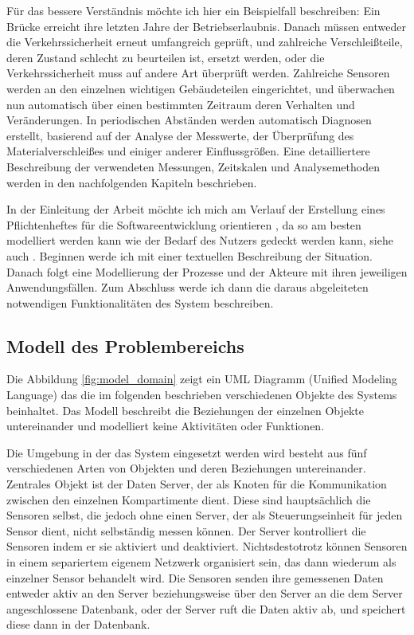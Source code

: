 Für das bessere Verständnis möchte ich hier ein Beispielfall beschreiben: Ein Brücke erreicht ihre letzten Jahre der Betriebserlaubnis. Danach müssen entweder die Verkehrssicherheit erneut umfangreich geprüft, und zahlreiche Verschleißteile, deren Zustand schlecht zu beurteilen ist, ersetzt werden, oder die Verkehrssicherheit muss auf andere Art überprüft werden. Zahlreiche Sensoren werden an den einzelnen wichtigen Gebäudeteilen eingerichtet, und überwachen nun automatisch über einen bestimmten Zeitraum deren Verhalten und Veränderungen. In periodischen Abständen werden automatisch Diagnosen erstellt, basierend auf der Analyse der Messwerte, der Überprüfung des Materialverschleißes und einiger anderer Einflussgrößen. Eine detailliertere Beschreibung der verwendeten Messungen, Zeitskalen und Analysemethoden werden in den nachfolgenden Kapiteln beschrieben.

In der Einleitung der Arbeit möchte ich mich am Verlauf der Erstellung eines Pflichtenheftes für die Softwareentwicklung orientieren , da so am besten modelliert werden kann wie der Bedarf des Nutzers gedeckt werden kann, siehe auch \citep{gregor_engels_vorlesung_2006}. Beginnen werde ich mit einer textuellen Beschreibung der Situation. Danach folgt eine Modellierung der Prozesse und der Akteure mit ihren jeweiligen Anwendungsfällen. Zum Abschluss werde ich dann die daraus abgeleiteten notwendigen Funktionalitäten des System beschreiben.


\subsection{Modell des Problembereichs}
Die Abbildung \ref{fig:model_domain} zeigt ein UML Diagramm (Unified Modeling Language) das die im folgenden beschrieben verschiedenen Objekte des Systems beinhaltet. Das Modell beschreibt die Beziehungen der einzelnen Objekte untereinander und modelliert keine Aktivitäten oder Funktionen.

Die Umgebung in der das System eingesetzt werden wird besteht aus fünf verschiedenen Arten von Objekten und deren Beziehungen untereinander. Zentrales Objekt ist der Daten Server, der als Knoten für die Kommunikation zwischen den einzelnen Kompartimente dient. Diese sind hauptsächlich die Sensoren selbst, die jedoch ohne einen Server, der als Steuerungseinheit für jeden Sensor dient, nicht selbständig messen können. Der Server kontrolliert die Sensoren indem er sie aktiviert und deaktiviert. Nichtsdestotrotz können Sensoren in einem separiertem eigenem Netzwerk organisiert sein, das dann wiederum als einzelner Sensor behandelt wird. Die Sensoren senden ihre gemessenen Daten entweder aktiv an den Server beziehungsweise über den Server an die dem Server angeschlossene Datenbank, oder der Server ruft die Daten aktiv ab, und speichert diese dann in der Datenbank.

